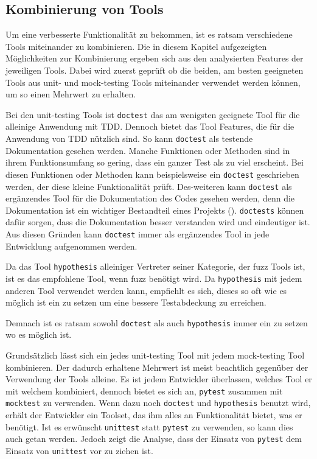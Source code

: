 \subsection{Kombinierung von Tools}\label{python-tools:kombination}
Um eine verbesserte Funktionalität zu bekommen, ist es ratsam verschiedene
Tools miteinander zu kombinieren. Die in diesem Kapitel aufgezeigten
Möglichkeiten zur Kombinierung ergeben sich aus den analysierten Features der
jeweiligen Tools. Dabei wird zuerst geprüft ob die beiden, am besten geeigneten
Tools aus unit- und \gls{mock}-testing Tools miteinander verwendet werden
können, um so einen Mehrwert zu erhalten.

Bei den unit-testing Tools ist \lstinline{doctest} das am wenigsten geeignete
Tool für die alleinige Anwendung mit TDD. Dennoch bietet das Tool Features, die
für die Anwendung von TDD nützlich sind. So kann \lstinline{doctest} als
testende Dokumentation gesehen werden. Manche Funktionen oder Methoden sind in
ihrem Funktionsumfang so gering, dass ein ganzer Test als zu viel erscheint.
Bei diesen Funktionen oder Methoden kann beispielsweise ein
\lstinline{doctest} geschrieben werden, der diese kleine Funktionalität prüft.
Des-weiteren kann \lstinline{doctest} als ergänzendes Tool für die
Dokumentation des Codes gesehen werden, denn die Dokumentation ist ein
wichtiger Bestandteil eines Projekts (\cite{python.org:PEP8}).
\lstinline{doctests} können dafür sorgen, dass die Dokumentation besser
verstanden wird und eindeutiger ist. Aus diesen Gründen kann
\lstinline{doctest} immer als ergänzendes Tool in jede Entwicklung aufgenommen
werden.

Da das Tool \lstinline{hypothesis} alleiniger Vertreter seiner Kategorie, der 
\gls{fuzz} Tools ist, ist es das empfohlene Tool, wenn \gls{fuzz} benötigt wird.
Da \lstinline{hypothesis} mit jedem anderen Tool verwendet werden kann,
empfiehlt es sich, dieses so oft wie es möglich ist ein zu setzen um eine
bessere Testabdeckung zu erreichen.

Demnach ist es ratsam sowohl \lstinline{doctest} als auch 
\lstinline{hypothesis} immer ein zu setzen wo es möglich ist.
\newline

Grundsätzlich lässt sich ein jedes unit-testing Tool mit jedem  
\gls{mock}-testing Tool kombinieren. Der dadurch erhaltene Mehrwert ist meist 
beachtlich gegenüber der Verwendung der Tools alleine. Es ist jedem Entwickler 
überlassen, welches Tool er mit welchem kombiniert, dennoch bietet es sich an, 
\lstinline{pytest} zusammen mit \lstinline{mocktest} zu verwenden. Wenn dazu 
noch \lstinline{doctest} und \lstinline{hypothesis} benutzt wird, erhält der 
Entwickler ein Toolset, das ihm alles an Funktionalität bietet, was er 
benötigt. Ist es erwünscht \lstinline{unittest} statt \lstinline{pytest} 
zu verwenden, so kann dies auch getan werden. Jedoch zeigt die Analyse, dass 
der Einsatz von \lstinline{pytest} dem Einsatz von \lstinline{unittest} vor zu 
ziehen ist.